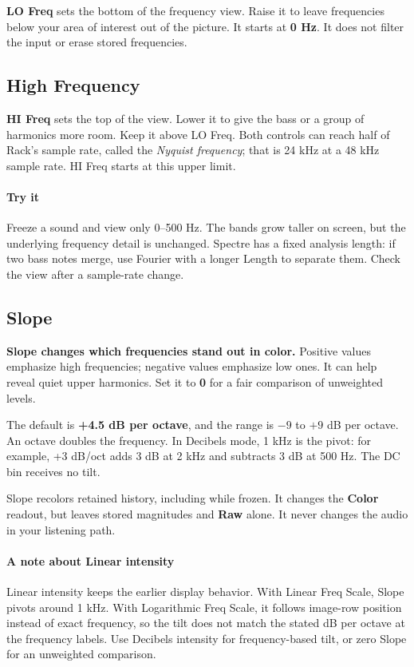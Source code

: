 \textbf{LO Freq} sets the bottom of the frequency view. Raise it to leave
frequencies below your area of interest out of the picture. It starts at
\textbf{0 Hz}. It does not filter the input or erase stored frequencies.

\subsection{High Frequency}

\textbf{HI Freq} sets the top of the view. Lower it to give the bass or a
group of harmonics more room. Keep it above LO Freq. Both controls can reach
half of Rack's sample rate, called the \textit{Nyquist frequency}; that is
24 kHz at a 48 kHz sample rate. HI Freq starts at this upper limit.

\paragraph{Try it}
Freeze a sound and view only 0--500 Hz. The bands grow taller on screen,
but the underlying frequency detail is unchanged. Spectre has a fixed
analysis length: if two bass notes merge, use Fourier with a longer Length
to separate them. Check the view after a sample-rate change.

\subsection{Slope}

\textbf{Slope changes which frequencies stand out in color.} Positive
values emphasize high frequencies; negative values emphasize low ones.
It can help reveal quiet upper harmonics. Set it to \textbf{0} for a fair
comparison of unweighted levels.

The default is \textbf{+4.5 dB per octave}, and the range is $-9$ to
$+9$ dB per octave. An octave doubles the frequency. In Decibels mode,
1 kHz is the pivot: for example, +3 dB/oct adds 3 dB at 2 kHz and subtracts
3 dB at 500 Hz. The DC bin receives no tilt.

Slope recolors retained history, including while frozen. It changes the
\textbf{Color} readout, but leaves stored magnitudes and \textbf{Raw} alone.
It never changes the audio in your listening path.

\paragraph{A note about Linear intensity}
Linear intensity keeps the earlier display behavior. With Linear Freq Scale,
Slope pivots around 1 kHz. With Logarithmic Freq Scale, it follows image-row
position instead of exact frequency, so the tilt does not match the stated
dB per octave at the frequency labels. Use Decibels intensity for frequency-based
tilt, or zero Slope for an unweighted comparison.

\endgroup
